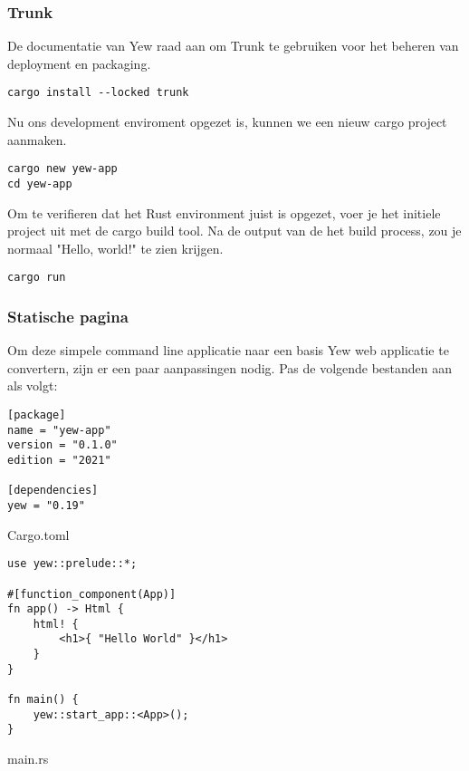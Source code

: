 \subsubsection{Trunk}

De documentatie van Yew raad aan om Trunk te gebruiken voor het beheren van deployment en packaging.

\begin{verbatim}
cargo install --locked trunk
\end{verbatim}

Nu ons development enviroment opgezet is, kunnen we een nieuw cargo project aanmaken.

\begin{verbatim}
cargo new yew-app
cd yew-app
\end{verbatim}

Om te verifieren dat het Rust environment juist is opgezet, voer je het initiele project uit met de
cargo build tool. Na de output van de het build process, zou je normaal "Hello, world!" te zien
krijgen.

\begin{verbatim}
cargo run
\end{verbatim}

\subsubsection{Statische pagina}

Om deze simpele command line applicatie naar een basis Yew web applicatie te convertern, zijn er een
paar aanpassingen nodig. Pas de volgende bestanden aan als volgt:

\begin{listing}[h]
\begin{verbatim}
[package]
name = "yew-app"
version = "0.1.0"
edition = "2021"

[dependencies]
yew = "0.19"
\end{verbatim}
\caption{Cargo.toml}
\end{listing}

\clearpage

\begin{listing}[h]
\begin{verbatim}
use yew::prelude::*;

#[function_component(App)]
fn app() -> Html {
    html! {
        <h1>{ "Hello World" }</h1>
    }
}

fn main() {
    yew::start_app::<App>();
}
\end{verbatim}
\caption{main.rs}
\end{listing}

